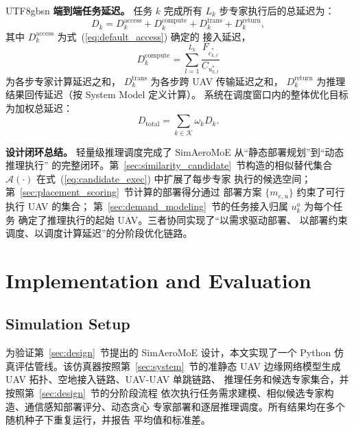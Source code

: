 \documentclass[conference]{IEEEtran}
\begin{document}
\begin{CJK*}{UTF8}{gbsn}
\textbf{端到端任务延迟。}
任务 $k$ 完成所有 $L_k$ 步专家执行后的总延迟为：
\begin{equation}
D_k = D_k^{\mathrm{access}} + D_k^{\mathrm{compute}}
    + D_k^{\mathrm{trans}} + D_k^{\mathrm{return}},
\label{eq:Dk}
\end{equation}
其中 $D_k^{\mathrm{access}}$ 为式~(\ref{eq:default_access}) 确定的
接入延迟，
\begin{equation}
D_k^{\mathrm{compute}} = \sum_{l=1}^{L_k} \frac{F_{\hat{e}^*_{k,l}}}{C_{u^*_{k,l}}}
\end{equation}
为各步专家计算延迟之和，
$D_k^{\mathrm{trans}}$ 为各步跨 UAV 传输延迟之和，
$D_k^{\mathrm{return}}$ 为推理结果回传延迟（按 System Model 定义计算）。
系统在调度窗口内的整体优化目标为加权总延迟：
\begin{equation}
D_{\mathrm{total}} = \sum_{k\in\mathcal{K}} \omega_k D_k.
\label{eq:Dtotal}
\end{equation}

\textbf{设计闭环总结。}
轻量级推理调度完成了 SimAeroMoE 从``静态部署规划''到``动态推理执行''
的完整闭环。第~\ref{sec:similarity_candidate}~节构造的相似替代集合
$\mathcal{A}(\cdot)$ 在式~(\ref{eq:candidate_exec}) 中扩展了每步专家
执行的候选空间；第~\ref{sec:placement_scoring}~节计算的部署得分通过
部署方案 $\{m_{e,u}\}$ 约束了可行执行 UAV 的集合；
第~\ref{sec:demand_modeling}~节的任务接入归属 $u_k^a$ 为每个任务
确定了推理执行的起始 UAV。三者协同实现了``以需求驱动部署、
以部署约束调度、以调度计算延迟''的分阶段优化链路。

\section{Implementation and Evaluation}
\label{sec:eval}

\subsection{Simulation Setup}
\label{sec:setup}

为验证第~\ref{sec:design}~节提出的 SimAeroMoE 设计，本文实现了一个
Python 仿真评估管线。该仿真器按照第~\ref{sec:system}~节的准静态
UAV 边缘网络模型生成 UAV 拓扑、空地接入链路、UAV-UAV 单跳链路、
推理任务和候选专家集合，并按照第~\ref{sec:design}~节的分阶段流程
依次执行任务需求建模、相似候选专家构造、通信感知部署评分、动态贪心
专家部署和逐层推理调度。所有结果均在多个随机种子下重复运行，并报告
平均值和标准差。


\end{CJK*}
\end{document}
